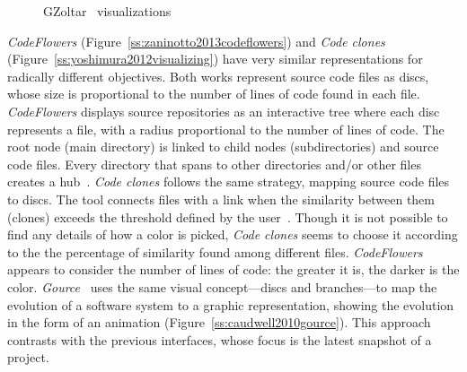 \begin{figure}
    \centering
    \caption{GZoltar~\cite{campos2012gzoltar} visualizations}
\end{figure}

\textit{CodeFlowers} (Figure~\ref{ss:zaninotto2013codeflowers}) and \textit{Code
clones} (Figure~\ref{ss:yoshimura2012visualizing}) have very similar
representations for radically different objectives. Both works represent source
code files as discs, whose size is proportional to the number of lines of code
found in each file. \textit{CodeFlowers} displays source repositories as an
interactive tree where each disc represents a file, with a radius proportional
to the number of lines of code. The root node (main directory) is linked to
child nodes (subdirectories) and source code files.
Every directory that spans to other directories and/or other files creates a
hub~\cite{zaninotto2013codeflowers}.
\textit{Code clones} follows the same strategy, mapping source code files to
discs. The tool connects files with a link when the similarity between them
(clones) exceeds the threshold defined by the
user~\cite{yoshimura2012visualizing}. Though it is not possible to find any
details of how a color is picked, \textit{Code clones} seems to choose it
according to the the percentage of similarity found among different files.
\textit{CodeFlowers} appears to consider the number of lines of code: the
greater it is, the darker is the color.
\textit{Gource}~\cite{caudwell2010gource} uses the same visual concept---discs
and branches---to map the evolution of a software system to a graphic
representation, showing the evolution in the form of an animation
(Figure~\ref{ss:caudwell2010gource}). This approach contrasts with the previous
interfaces, whose focus is the latest snapshot of a project.

